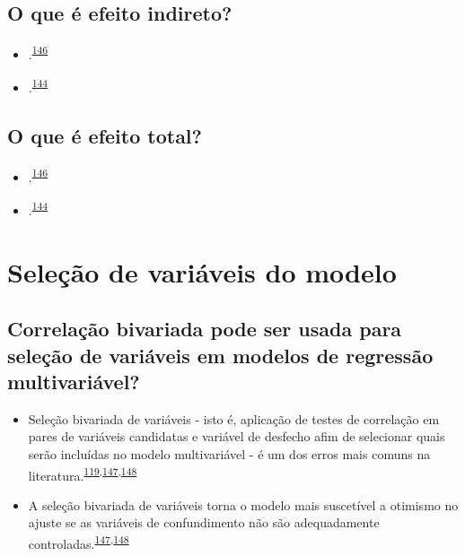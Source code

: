 \documentclass[
  a4paper,
]{book}
\begin{document}
\hypertarget{o-que-uxe9-efeito-indireto}{%
\subsection{O que é efeito indireto?}\label{o-que-uxe9-efeito-indireto}}

\begin{itemize}
\item
  .\textsuperscript{\protect\hyperlink{ref-Baron1986}{146}}
\item
  .\textsuperscript{\protect\hyperlink{ref-Bours2023}{144}}
\end{itemize}

\hypertarget{o-que-uxe9-efeito-total}{%
\subsection{O que é efeito total?}\label{o-que-uxe9-efeito-total}}

\begin{itemize}
\item
  .\textsuperscript{\protect\hyperlink{ref-Baron1986}{146}}
\item
  .\textsuperscript{\protect\hyperlink{ref-Bours2023}{144}}
\end{itemize}

\hypertarget{selecao}{%
\section{Seleção de variáveis do modelo}\label{selecao}}

\hypertarget{correlauxe7uxe3o-bivariada-pode-ser-usada-para-seleuxe7uxe3o-de-variuxe1veis-em-modelos-de-regressuxe3o-multivariuxe1vel}{%
\subsection{Correlação bivariada pode ser usada para seleção de variáveis em modelos de regressão multivariável?}\label{correlauxe7uxe3o-bivariada-pode-ser-usada-para-seleuxe7uxe3o-de-variuxe1veis-em-modelos-de-regressuxe3o-multivariuxe1vel}}

\begin{itemize}
\item
  Seleção bivariada de variáveis - isto é, aplicação de testes de correlação em pares de variáveis candidatas e variável de desfecho afim de selecionar quais serão incluídas no modelo multivariável - é um dos erros mais comuns na literatura.\textsuperscript{\protect\hyperlink{ref-heinze2016}{119},\protect\hyperlink{ref-Dales1978}{147},\protect\hyperlink{ref-Sun1996}{148}}
\item
  A seleção bivariada de variáveis torna o modelo mais suscetível a otimismo no ajuste se as variáveis de confundimento não são adequadamente controladas.\textsuperscript{\protect\hyperlink{ref-Dales1978}{147},\protect\hyperlink{ref-Sun1996}{148}}
\end{itemize}
\end{document}
